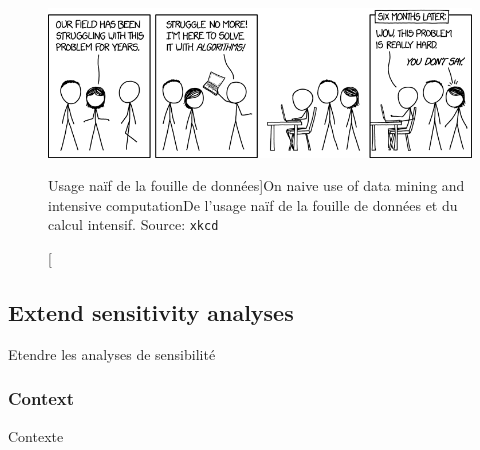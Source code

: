 \begin{figure}
\includegraphics[width=\linewidth]{Figures/Computation/here_to_help}
\caption[Naive use of data mining and computation][Usage naïf de la fouille de données]{On naive use of data mining and intensive computation\label{fig:computation:xkcd}}{De l'usage naïf de la fouille de données et du calcul intensif. Source: \texttt{xkcd}\label{fig:computation:xkcd}}
\end{figure}











\subsection{Extend sensitivity analyses}{Etendre les analyses de sensibilité}
	
	

\subsubsection{Context}{Contexte}


